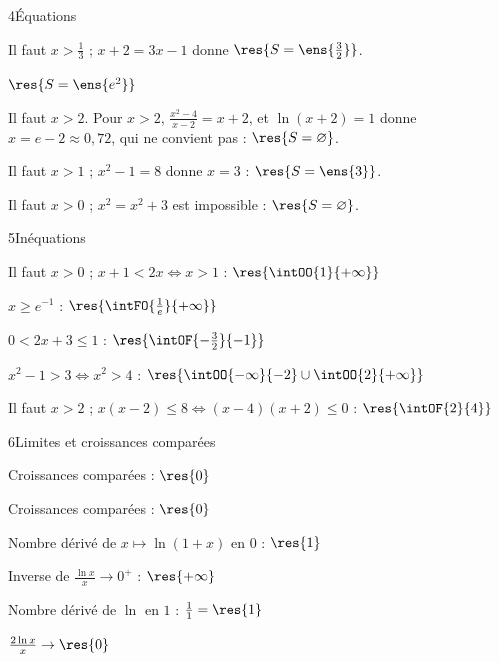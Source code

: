 \begin{deuxcolonnes}
\begin{corrige}{4}{Équations}
\begin{questions}
  \item Il faut $x>\frac13$ ; $x+2=3x-1$ donne $\res{S=\ens{\frac32}}$.
  \item $\res{S=\ens{e^{2}}}$
  \item Il faut $x>2$. Pour $x>2$, $\frac{x^{2}-4}{x-2}=x+2$, et $\ln(x+2)=1$ donne $x=e-2\approx0{,}72$, qui ne convient pas : $\res{S=\varnothing}$.
  \item Il faut $x>1$ ; $x^{2}-1=8$ donne $x=3$ : $\res{S=\ens{3}}$.
  \item Il faut $x>0$ ; $x^{2}=x^{2}+3$ est impossible : $\res{S=\varnothing}$.
\end{questions}
\end{corrige}

\begin{corrige}{5}{Inéquations}
\begin{questions}
  \item Il faut $x>0$ ; $x+1<2x\iff x>1$ : $\res{\intOO{1}{+\infty}}$
  \item $x\geq e^{-1}$ : $\res{\intFO{\frac1e}{+\infty}}$
  \item $0<2x+3\leq1$ : $\res{\intOF{-\frac32}{-1}}$
  \item $x^{2}-1>3\iff x^{2}>4$ : $\res{\intOO{-\infty}{-2}\cup\intOO{2}{+\infty}}$
  \item Il faut $x>2$ ; $x(x-2)\leq8\iff(x-4)(x+2)\leq0$ : $\res{\intOF{2}{4}}$
\end{questions}
\end{corrige}

\begin{corrige}{6}{Limites et croissances comparées}
\begin{questions}
  \item Croissances comparées : $\res{0}$
  \item Croissances comparées : $\res{0}$
  \item Nombre dérivé de $x\mapsto\ln(1+x)$ en $0$ : $\res{1}$
  \item Inverse de $\frac{\ln x}{x}\to0^{+}$ : $\res{+\infty}$
  \item Nombre dérivé de $\ln$ en $1$ : $\frac11=\res{1}$
  \item $\frac{2\ln x}{x}\to\res{0}$
\end{questions}
\end{corrige}


\end{deuxcolonnes}
